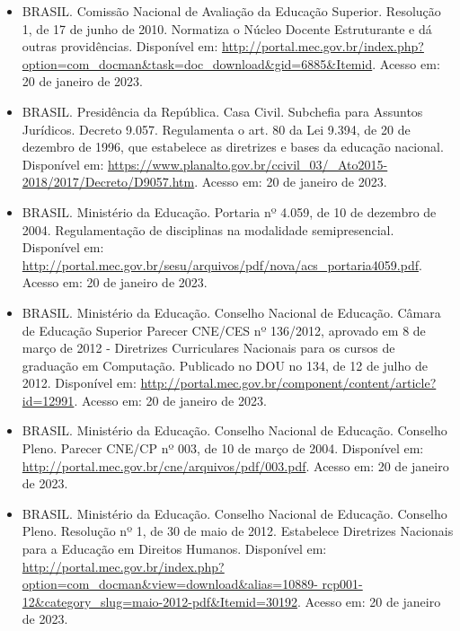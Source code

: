 \begin{itemize}
    \item BRASIL. Comissão Nacional de Avaliação da Educação Superior.
    Resolução 1, de 17 de junho de 2010. Normatiza o Núcleo Docente
    Estruturante e dá outras providências. 
    Disponível em: \url{http://portal.mec.gov.br/index.php?option=com_docman&task=doc_download&gid=6885&Itemid}.
    Acesso em: 20 de janeiro de 2023.
    
    \item BRASIL. Presidência da República. Casa Civil. Subchefia para Assuntos
    Jurídicos. Decreto 9.057. Regulamenta o art. 80 da Lei 9.394, de 20 de
    dezembro de 1996, que estabelece as diretrizes e bases da educação
    nacional. 
    Disponível em: \url{https://www.planalto.gov.br/ccivil_03/_Ato2015-2018/2017/Decreto/D9057.htm}.
    Acesso em: 20 de janeiro de 2023.
    
    \item BRASIL. Ministério da Educação. Portaria nº 4.059, de 10 de dezembro
    de 2004. Regulamentação de disciplinas na modalidade semipresencial.
    Disponível em: \url{http://portal.mec.gov.br/sesu/arquivos/pdf/nova/acs_portaria4059.pdf}.
    Acesso em: 20 de janeiro de 2023.
    
    \item BRASIL. Ministério da Educação. Conselho Nacional de Educação. Câmara
    de Educação Superior Parecer CNE/CES nº 136/2012, aprovado em 8 de março de
    2012 - Diretrizes Curriculares Nacionais para os cursos de graduação em
    Computação. 
    Publicado no DOU no 134, de 12 de julho de 2012.
    Disponível em: \url{http://portal.mec.gov.br/component/content/article?id=12991}.
    Acesso em: 20 de janeiro de 2023.
    
    \item BRASIL. Ministério da Educação. Conselho Nacional de Educação.
    Conselho Pleno. Parecer CNE/CP nº 003, de 10 de março de 2004.
    Disponível em: \url{http://portal.mec.gov.br/cne/arquivos/pdf/003.pdf}. 
    Acesso em: 20 de janeiro de 2023.
    
    \item BRASIL. Ministério da Educação. Conselho Nacional de Educação.
    Conselho Pleno. Resolução nº 1, de 30 de maio de 2012. Estabelece
    Diretrizes Nacionais para a Educação em Direitos Humanos. 
    Disponível em: \url{http://portal.mec.gov.br/index.php?option=com_docman&view=download&alias=10889-
    rcp001-12&category_slug=maio-2012-pdf&Itemid=30192}. 
    Acesso em: 20 de janeiro de 2023.
    

\end{itemize}

